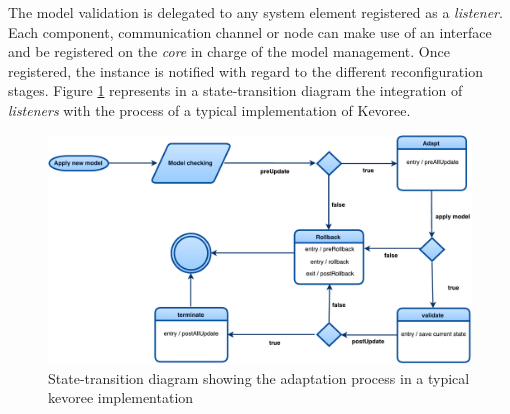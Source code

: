 The model validation is delegated to any system element registered as a \textit{listener}.
Each component, communication channel or node can make use of an interface and be registered on the \textit{core} in charge of the model management.
Once registered, the instance is notified with regard to the different reconfiguration stages.
Figure \ref{fig:MAR_modelListener} represents in a state-transition diagram the integration of \textit{listeners} with the process of a typical implementation of Kevoree.

\begin{figure}[]
	\centering
	\includegraphics[width=1\columnwidth]{chapters/modelsAtRuntimeContiki.images/ModelListenerStateChart.pdf}
	\caption{State-transition diagram showing the adaptation process in a typical kevoree implementation}
	\label{fig:MAR_modelListener}
\end{figure}

